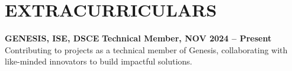 \documentclass[letterpaper,11pt]{article}
\begin{document}
\vspace{-6pt}
 

\section{EXTRACURRICULARS}
\vspace{3pt}
     
            {\normalsize\textbf{GENESIS, ISE, DSCE} \hfill \small\textbf{{Technical Member, NOV 2024 -- Present}} \\ 
              Contributing to projects as a technical member of Genesis, collaborating with like-minded innovators to build impactful solutions.}
\end{document}
